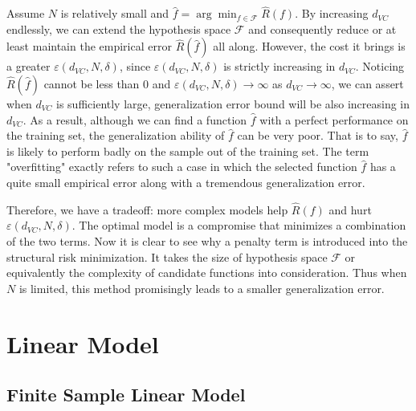 \documentclass{report}
\theoremstyle{nonumberplain}
\newcommand{\0}{\mathbf{0}}
\begin{document}
Assume $N$ is relatively small and $\hat{f}=\arg\min_{f\in\mathcal{F}}\widehat{R}(f).$ By increasing $d_{VC}$ endlessly, we can extend the hypothesis space $\mathcal{F}$ and consequently reduce or at least maintain the empirical error $\widehat{R}(\hat{f})$ all along. However, the cost it brings is a greater $\varepsilon(d_{VC}, N, \delta)$, since $\varepsilon(d_{VC}, N, \delta)$ is strictly increasing in $d_{VC}$. Noticing $\widehat{R}(\hat{f})$ cannot be less than 0 and $\varepsilon(d_{VC}, N, \delta)\to\infty$ as $d_{VC}\to\infty$, we can assert when $d_{VC}$ is sufficiently large, generalization error bound will be also increasing in $d_{VC}$. As a result, although we can find a function $\hat{f}$ with a perfect performance on the training set, the generalization ability of $\hat{f}$ can be very poor. That is to say, $\hat{f}$ is likely to perform badly on the sample out of the training set. The term "overfitting" exactly refers to such a case in which the selected function $\hat{f}$ has a quite small empirical error along with a tremendous generalization error. 

Therefore, we have a tradeoff: more complex models help $\widehat{R}(f)$
and hurt $\varepsilon(d_{VC}, N, \delta)$. The optimal model is a compromise that minimizes a combination of the two terms. Now it is clear to see why a penalty term is introduced into the structural risk minimization. It takes the size of hypothesis space $\mathcal{F}$ or equivalently the complexity of candidate functions into consideration. Thus when $N$ is limited, this method promisingly leads to a smaller generalization error.






\chapter{Linear Model}
\section{Finite Sample Linear Model}
\end{document}
